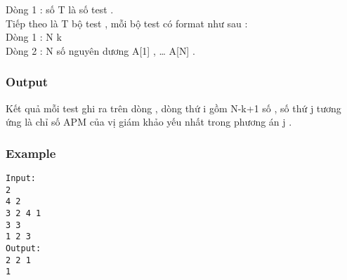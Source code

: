    Dòng 1 : số T là số test .   
\\   Tiếp theo là T bộ test , mỗi bộ test có format như sau :   
\\   Dòng 1 : N k   
\\   Dòng 2 : N số nguyên dương A[1] , … A[N] .   
\\

\subsubsection{   Output  }

   Kết quả mỗi test ghi ra trên dòng , dòng thứ i gồm N-k+1 số , số thứ j tương ứng là chỉ số APM của vị giám khảo yếu nhất trong phương án j .  

\subsubsection{   Example  }
\begin{verbatim}
Input:
2
4 2
3 2 4 1
3 3
1 2 3
Output:
2 2 1
1
\end{verbatim}